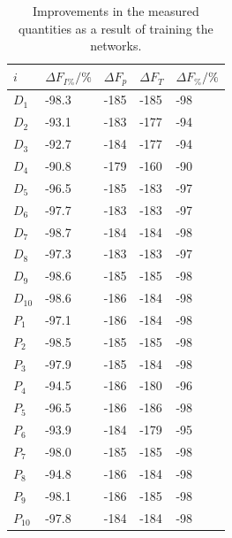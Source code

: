 \documentclass[12pt, titlepage]{report}
\theoremstyle{definition}
\begin{document}
\begin{table}
    \begin{tabularx}{\textwidth}{lXXXX} \toprule
    {$i$}  & {$\Delta F_{I\%} / \%$}	            & {$\Delta F_p$} 	    & {$\Delta F_T$} 	        & {$\Delta F_{\%} / \%$} \\ \midrule
    $D_1$  & -98.3 							& -185 					& -185    	 				& -98 \\
    $D_2$  & -93.1 							& -183 					& -177  					& -94 \\
    $D_3$  & -92.7							& -184 					& -177  					& -94 \\
    $D_4$  & -90.8 							& -179 					& -160 					    & -90 \\
    $D_5$  & -96.5 							& -185 					& -183						& -97 \\
    $D_6$  & -97.7 							& -183 					& -183	  					& -97 \\
    $D_7$  & -98.7 							& -184 					& -184	  					& -98 \\
    $D_8$  & -97.3 							& -183 					& -183	  					& -97 \\
    $D_9$  & -98.6 							& -185 					& -185	  					& -98 \\
    $D_{10}$ & -98.6 						& -186 					& -184	  					& -98 \\ \midrule
    $P_1$  & -97.1  						& -186 					& -184		 				& -98 \\
    $P_2$  & -98.5  						& -185 					& -185	  					& -98 \\
    $P_3$  & -97.9 							& -185 					& -184	  					& -98 \\
    $P_4$  & -94.5  						& -186 					& -180  					& -96 \\
    $P_5$  & -96.5 							& -186 					& -186	   					& -98 \\
    $P_6$  & -93.9  						& -184 					& -179  					& -95 \\
    $P_7$  & -98.0  						& -185 					& -185	  					& -98 \\
    $P_8$  & -94.8  						& -186 					& -184	  					& -98 \\
    $P_9$  & -98.1  						& -186 					& -185	  					& -98 \\
    $P_{10}$ & -97.8  						& -184 					& -184						& -98 \\ \bottomrule
\end{tabularx}
\caption[Result improvement from before to after training]{Improvements in the measured quantities as a result of training the networks.}
\label{table:training_change}
\end{table}
\end{document}
